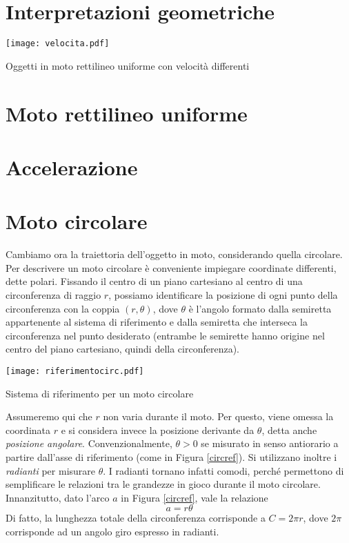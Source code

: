 \section{Interpretazioni geometriche}

\begin{marginfigure}
    \centering
    \texttt{[image: velocita.pdf]}
    \caption{Oggetti in moto rettilineo uniforme con velocità differenti}
\end{marginfigure}


\section{Moto rettilineo uniforme}


\section{Accelerazione}



\section{Moto circolare}
Cambiamo ora la traiettoria dell'oggetto in moto, considerando quella circolare.
Per descrivere un moto circolare è conveniente impiegare coordinate differenti,
dette polari. Fissando il centro di un piano cartesiano al centro di una
circonferenza di raggio $r$, possiamo identificare la posizione di ogni punto
della circonferenza con la coppia $(r, \theta)$, dove $\theta$ è l'angolo
formato dalla semiretta appartenente al sistema di riferimento e dalla semiretta
che interseca la circonferenza nel punto desiderato (entrambe le semirette
hanno origine nel centro del piano cartesiano, quindi della circonferenza).

\begin{marginfigure}
    \centering
    \texttt{[image: riferimentocirc.pdf]}
    \caption{Sistema di riferimento per un moto circolare}
    \label{circref}
\end{marginfigure}

Assumeremo qui che $r$ non varia durante il moto. Per questo, viene omessa
la coordinata $r$ e si considera invece la posizione derivante da $\theta$,
detta anche \textit{posizione angolare}. Convenzionalmente, $\theta > 0$ se
misurato in senso antiorario a partire dall'asse di riferimento (come in
Figura \ref{circref}). Si utilizzano inoltre i \textit{radianti} per misurare
$\theta$. I radianti tornano infatti comodi, perché permettono di semplificare
le relazioni tra le grandezze in gioco durante il moto circolare. Innanzitutto,
dato l'arco $a$ in Figura \ref{circref}, vale la relazione \[ a = r\theta \]
Di fatto, la lunghezza totale della circonferenza corrisponde a $C = 2\pi r$,
dove $2\pi$ corrisponde ad un angolo giro espresso in radianti.

